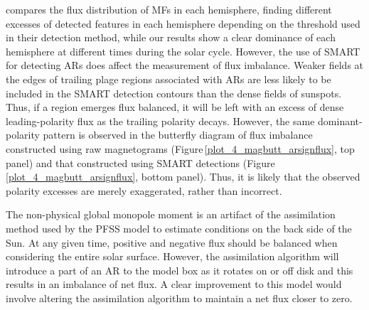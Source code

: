 \documentclass[namedreferences]{solarphysics}
\begin{document}
\begin{article}
\citet{meunier:2003} compares the flux distribution of MFs in each hemisphere, finding different excesses of detected features in each hemisphere depending on the threshold used in their detection method, while our results show a clear dominance of each hemisphere at different times during the solar cycle. However, the use of SMART for detecting ARs does affect the measurement of flux imbalance. Weaker fields at the edges of trailing plage regions associated with ARs are less likely to be included in the SMART detection contours than the dense fields of sunspots. Thus, if a region emerges flux balanced, it will be left with an excess of dense leading-polarity flux as the trailing polarity decays. However, the same dominant-polarity pattern is observed in the butterfly diagram of flux imbalance constructed using raw magnetograms (Figure\,\ref{plot_4_magbutt_arsignflux}, top panel) and that constructed using SMART detections (Figure\,\ref{plot_4_magbutt_arsignflux}, bottom panel). Thus, it is likely that the observed polarity excesses are merely exaggerated, rather than incorrect.  

The non-physical global monopole moment is an artifact of the assimilation method used by the PFSS model to estimate conditions on the back side of the Sun. At any given time, positive and negative flux should be balanced when considering the entire solar surface. However, the assimilation algorithm will introduce a part of an AR to the model box as it rotates on or off disk and this results in an imbalance of net flux. A clear improvement to this model would involve altering the assimilation algorithm to maintain a net flux closer to zero.



\end{article}
\end{document}
